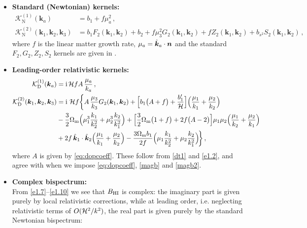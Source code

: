 \begin{itemize}
\item
{\bfseries Standard (Newtonian) kernels:}
\begin{align}
\mathcal{K}^{(1)}_{\mathrm{N}}(\bm{k}_{a}) &= b_{1}+f\mu_{a}^{2}\,,  \label{e1.7} \\ 
\mathcal{K}^{(2)}_{\mathrm{N}}(\bm{k}_{1}, \bm{k}_{2},{\bm{k}_3}) &= b_{1}F_{2}(\bm{k}_{1}, \bm{k}_{2}) + b_{2} + f\mu_{3}^{2}G_{2}(\bm{k}_{1}, \bm{k}_{2}) +{fZ_2}(\bm{k}_{1}, \bm{k}_{2})
+ b_{s^{2}}S_{2}(\bm{k}_{1}, \bm{k}_{2})\,, \label{e1.8}
\end{align}
where $f$ is the linear matter growth rate, $\mu_a=\hat{\bm {k}}_a\cdot\bm {n}$ and the standard $F_2,G_2,Z_2,S_2$ kernels are given in \cite{Maartens:2019yhx}.

\item
{\bfseries Leading-order relativistic kernels:} 
\begin{align}
\mathcal{K}^{(1)}_{\mathrm{D}}(\bm{k}_{a}) &= \mathrm{i}\,\mathcal{H} f A\,\frac{\mu_{a}}{k_{a}}\,, \label{e1.9} \\
\mathcal{K}^{(2)}_{\mathrm{D}}(\bm{k}_{1},\bm{k}_{2},\bm{k}_{3}) &= \mathrm{i\,}\,\mathcal{H} f \bigg\{
A\,\frac{\mu_{3}}{k_{3}}G_{2}(\bm{k}_{1},\bm{k}_{2})
+{\Big[b_1\big(A+f\big)+ \frac{b_1'}{\mathcal{H}} \Big]}\Big(\frac{\mu_{1}}{k_{1}} + \frac{\mu_{2}}{k_{2}}\Big)
\nonumber \\
&  -\frac{3}{2}\Omega_{\mathrm{m}} \Big(\mu_{1}^{3}\frac{k_{1}}{k_{2}^{2}} + \mu_{2}^{3}\frac{k_{2}}{k_{1}^{2}}\Big)
+{\Big[\frac{3}{2}\Omega_{\mathrm{m}} \big(1+f \big)+2f\big(A-2\big) \Big]}\mu_{1}\mu_{2}\Big(\frac{\mu_{1}}{k_{2}}+\frac{\mu_{2}}{k_{1}}\Big)
\nonumber \\
& +2f\,  {\hat{\bm{k}}_{1} \cdot \hat{\bm{k}}_2}\Big(\frac{\mu_{1}}{k_{1}} + \frac{\mu_{2}}{k_{2}}\Big) 
-\frac{3\Omega_{\mathrm{m}} b_1}{2f}\Big(\mu_{1}\frac{k_{1}}{k_{2}^{2}} + \mu_{2}\frac{k_{2}}{k_{1}^{2}}\Big)\!  \bigg\}\,,\label{e1.10}
\end{align}
where $A$ is given by \eqref{eq:dopcoeff}. These follow from \eqref{dt1} and \eqref{e1.2}, and {agree with \cite{Maartens:2019yhx} when we impose \eqref{eq:dopcoeff}, \eqref{magb} and \eqref{magb2}}.
\item
{\bfseries Complex bispectrum:}\\
From \eqref{e1.7}--\eqref{e1.10} we see that
$B_{{\mathrm{HI}}}$ is complex: {the imaginary part is given purely by local relativistic corrections, while at leading order, i.e. neglecting relativistic terms of $O(\mathcal{H}^2/k^2)$, the real part is given purely by the standard Newtonian bispectrum:}

\end{itemize}
